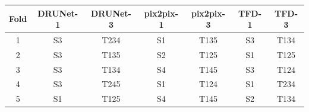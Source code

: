 \begin{tabular}{@{}ccccccc@{}}
\toprule
Fold & DRUNet-1 & DRUNet-3 & pix2pix-1 & pix2pix-3 & TFD-1 & TFD-3\\
\midrule
1 & S3 & T234 & S1 & T135 & S3 & T134\\
2 & S3 & T135 & S2 & T125 & S1 & T125\\
3 & S3 & T134 & S4 & T145 & S3 & T124\\
4 & S3 & T245 & S1 & T124 & S1 & T234\\
5 & S1 & T125 & S4 & T145 & S2 & T134\\
\bottomrule
\end{tabular}
